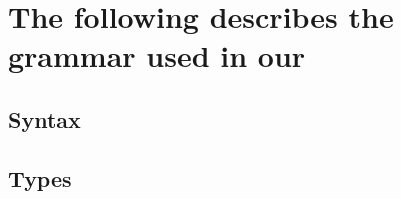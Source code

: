 \section{The following describes the grammar used in our}
\subsection{Syntax}
\ottgrammar
\subsection{Types}
